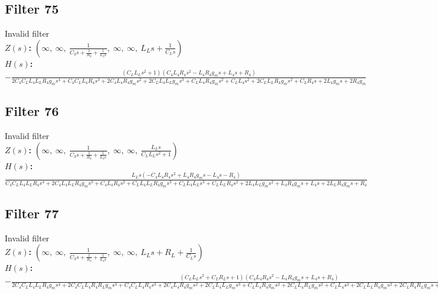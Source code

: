 \documentclass{article}
\begin{document}
\subsection*{Filter 75}
Invalid filter \\ 
\textbf{$Z(s)$:} $\left( \infty, \  \infty, \  \frac{1}{C_{3} s + \frac{1}{R_{3}} + \frac{1}{L_{3} s}}, \  \infty, \  \infty, \  L_{L} s + \frac{1}{C_{L} s}\right)$ \\ 
\textbf{$H(s)$:} $- \frac{\left(C_{L} L_{L} s^{2} + 1\right) \left(C_{4} L_{4} R_{4} s^{2} - L_{4} R_{4} g_{m} s + L_{4} s + R_{4}\right)}{2 C_{4} C_{L} L_{4} L_{L} R_{4} g_{m} s^{4} + C_{4} C_{L} L_{4} R_{4} s^{3} + 2 C_{4} L_{4} R_{4} g_{m} s^{2} + 2 C_{L} L_{4} L_{L} g_{m} s^{3} + C_{L} L_{4} R_{4} g_{m} s^{2} + C_{L} L_{4} s^{2} + 2 C_{L} L_{L} R_{4} g_{m} s^{2} + C_{L} R_{4} s + 2 L_{4} g_{m} s + 2 R_{4} g_{m}}$ \\ 
\subsection*{Filter 76}
Invalid filter \\ 
\textbf{$Z(s)$:} $\left( \infty, \  \infty, \  \frac{1}{C_{3} s + \frac{1}{R_{3}} + \frac{1}{L_{3} s}}, \  \infty, \  \infty, \  \frac{L_{L} s}{C_{L} L_{L} s^{2} + 1}\right)$ \\ 
\textbf{$H(s)$:} $\frac{L_{L} s \left(- C_{4} L_{4} R_{4} s^{2} + L_{4} R_{4} g_{m} s - L_{4} s - R_{4}\right)}{C_{4} C_{L} L_{4} L_{L} R_{4} s^{4} + 2 C_{4} L_{4} L_{L} R_{4} g_{m} s^{3} + C_{4} L_{4} R_{4} s^{2} + C_{L} L_{4} L_{L} R_{4} g_{m} s^{3} + C_{L} L_{4} L_{L} s^{3} + C_{L} L_{L} R_{4} s^{2} + 2 L_{4} L_{L} g_{m} s^{2} + L_{4} R_{4} g_{m} s + L_{4} s + 2 L_{L} R_{4} g_{m} s + R_{4}}$ \\ 
\subsection*{Filter 77}
Invalid filter \\ 
\textbf{$Z(s)$:} $\left( \infty, \  \infty, \  \frac{1}{C_{3} s + \frac{1}{R_{3}} + \frac{1}{L_{3} s}}, \  \infty, \  \infty, \  L_{L} s + R_{L} + \frac{1}{C_{L} s}\right)$ \\ 
\textbf{$H(s)$:} $- \frac{\left(C_{L} L_{L} s^{2} + C_{L} R_{L} s + 1\right) \left(C_{4} L_{4} R_{4} s^{2} - L_{4} R_{4} g_{m} s + L_{4} s + R_{4}\right)}{2 C_{4} C_{L} L_{4} L_{L} R_{4} g_{m} s^{4} + 2 C_{4} C_{L} L_{4} R_{4} R_{L} g_{m} s^{3} + C_{4} C_{L} L_{4} R_{4} s^{3} + 2 C_{4} L_{4} R_{4} g_{m} s^{2} + 2 C_{L} L_{4} L_{L} g_{m} s^{3} + C_{L} L_{4} R_{4} g_{m} s^{2} + 2 C_{L} L_{4} R_{L} g_{m} s^{2} + C_{L} L_{4} s^{2} + 2 C_{L} L_{L} R_{4} g_{m} s^{2} + 2 C_{L} R_{4} R_{L} g_{m} s + C_{L} R_{4} s + 2 L_{4} g_{m} s + 2 R_{4} g_{m}}$ \\ 
\end{document}
